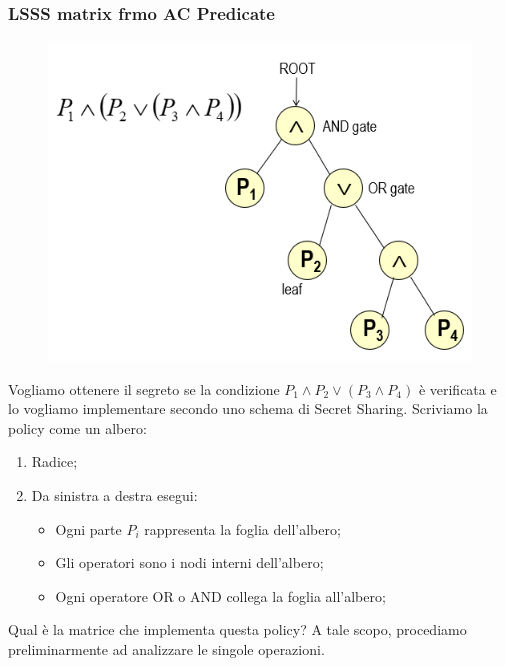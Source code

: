 \documentclass{book}
\begin{document}
\subsubsection{LSSS matrix frmo AC Predicate}
\setlength\intextsep{0pt}
\begin{figure}
	\centering
    \includegraphics[scale=0.4]{2022-01-08-17-38-41.png}%
\end{figure}
Vogliamo ottenere il segreto se la condizione \(P_{1}\wedge P_{2}\vee (P_{3}\wedge P_{4})\) è verificata e lo vogliamo implementare secondo uno schema di Secret Sharing\@. Scriviamo la policy come un albero:
\begin{enumerate}
    \item Radice;
    \item Da sinistra a destra esegui:\begin{itemize}
        \item Ogni parte \(P_{i}\) rappresenta la foglia dell'albero;
        \item Gli operatori sono i nodi interni dell'albero;
        \item Ogni operatore OR o AND collega la foglia all'albero;
    \end{itemize}
\end{enumerate}
Qual è la matrice che implementa questa policy? A tale scopo, procediamo preliminarmente ad analizzare le singole operazioni\@.
\end{document}
